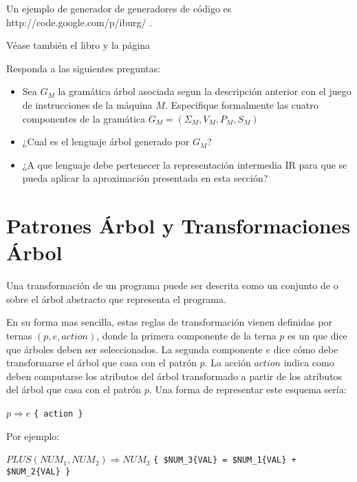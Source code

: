 Un ejemplo de generador de generadores de código 
es 
                  {http://code.google.com/p/iburg/}
\cite{Proebsting}.

Véase también el libro 
y la página 

\begin{exercise}
Responda a las siguientes preguntas:
\begin{itemize}
\item
Sea $G_M$ la gramática árbol asociada segun la descripción anterior
con el juego de instrucciones de la máquina $M$. Especifique formalmente
las cuatro componentes de la gramática $G_M = (\Sigma_M, V_M, P_M, S_M)$ 
\item
¿Cual es el lenguaje árbol generado por $G_M$?
\item
¿A que lenguaje debe pertenecer la representación intermedia IR para
que se pueda aplicar la aproximación presentada en esta sección?
\end{itemize}
\end{exercise}

\section{Patrones Árbol y Transformaciones Árbol}
\label{section:eyappatronesarbol}
Una transformación de un programa puede ser descrita
como un conjunto de  
o 
sobre el árbol abstracto que representa el programa.

En su forma mas sencilla, estas reglas de transformación
vienen definidas
por ternas $(p, e, action)$, donde la primera componente de la
terna $p$ es un  que dice que árboles
deben ser seleccionados. La segunda componente 
$e$ dice cómo debe transformarse el árbol que casa con el patrón
$p$. La acción $action$ indica como deben
computarse los atributos del árbol transformado
a partir de los atributos 
del árbol que casa con el patrón $p$.
Una forma de representar este esquema sería:

\begin{center}
$p \Longrightarrow e$  \verb|{ action }|
\end{center}

Por ejemplo:

\vspace{0.25cm}
$PLUS(NUM_1, NUM_2) \Longrightarrow NUM_3$ \verb|{ $NUM_3{VAL} = $NUM_1{VAL} + $NUM_2{VAL} }|
\vspace{0.25cm}

